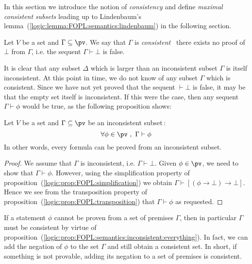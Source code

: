 In this section we introduce the notion of {\em consistency} and
define {\em maximal consistent subsets} leading up to Lindenbaum's
lemma~(\ref{logic:lemma:FOPL:semantics:lindenbaum}) in the following
section.

\begin{defin}\label{logic:def:FOPL:semantics:consistent:subset}
Let $V$ be a set and $\Gamma\subseteq\pv$. We say that $\Gamma$ is
{\em consistent} \ifand\ there exists no proof of $\bot$ from
$\Gamma$, i.e. the sequent $\Gamma\vdash\bot$ is false.
\end{defin}

It is clear that any subset $\Delta$ which is larger than an
inconsistent subset $\Gamma$ is itself inconsistent. At this point
in time, we do not know of any subset $\Gamma$ which is consistent.
Since we have not yet proved that the sequent $\vdash\bot$ is false,
it may be that the empty set itself is inconsistent. If this were
the case, then any sequent $\Gamma\vdash\phi$ would be true, as the
following proposition shows:

\begin{prop}\label{logic:prop:FOPL:semantics:inconsistent:everything}
Let $V$ be a set and $\Gamma\subseteq\pv$ be an inconsistent
subset\,:
    \[
    \forall\phi\in\pv\ ,\ \Gamma\vdash\phi
    \]
In other words, every formula can be proved from an inconsistent
subset.
\end{prop}
\begin{proof}
We assume that $\Gamma$ is inconsistent, i.e. $\Gamma\vdash\bot$.
Given $\phi\in\pv$, we need to show that $\Gamma\vdash\phi$.
However, using the simplification property of
proposition~(\ref{logic:prop:FOPL:simplification}) we obtain
$\Gamma\vdash[(\phi\to\bot)\to\bot]$. Hence we see from the
transposition property of
proposition~(\ref{logic:prop:FOPL:transposition}) that
$\Gamma\vdash\phi$ as requested.
\end{proof}

If a statement $\phi$ cannot be proven from a set of premises
$\Gamma$, then in particular $\Gamma$ must be consistent by virtue
of
proposition~(\ref{logic:prop:FOPL:semantics:inconsistent:everything}).
In fact, we can add the negation of $\phi$ to the set $\Gamma$ and
still obtain a consistent set. In short, if something is not
provable, adding its negation to a set of premises is consistent.

